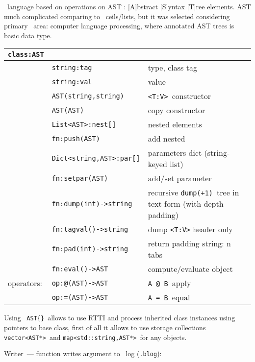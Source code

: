 \label{ast}\secdown

\bi\ language based on operations on AST :
[A]bstract [S]yntax [T]ree elements. AST much complicated comparing
to \lisp\ ceils/lists, but it was selected considering primary \bi\ area:
computer language processing, where annotated AST trees is basic data type.

\bigskip
\begin{tabular}{l l l}
\verb|class:AST| &&\\
\hline
& \verb|string:tag| & type, class tag \\
& \verb|string:val| & value \\
\hline
& \verb|AST(string,string)| & \verb|<T:V>|\ constructor \\
& \verb|AST(AST)| & copy constructor \\
\hline
& \verb|List<AST>:nest[]| & nested elements \\
& \verb|fn:push(AST)| & add nested \\
\hline
& \verb|Dict<string,AST>:par[]| & parameters dict (string-keyed list) \\
& \verb|fn:setpar(AST)| & add/set parameter \\
\hline
& \verb|fn:dump(int)->string| & recursive \verb|dump(+1)|\ tree in text
form (with depth padding) \\
& \verb|fn:tagval()->string| & dump \verb|<T:V>| header only \\
& \verb|fn:pad(int)->string| & return padding string: n tabs \\
\hline
& \verb|fn:eval()->AST| & compute/evaluate object \\
operators: & \verb|op:@(AST)->AST| & \verb|A @ B|\ apply \\
& \verb|op:=(AST)->AST| & \verb|A = B|\ equal \\
\end{tabular} 


Using \ \verb|AST{}|\ allows to use RTTI and process
inherited class instances using pointers to base class, first of all it allows
to use storage collections \verb|vector<AST*>|\ and
\verb|map<std::string,AST*>|\ for any objects.  


Writer\ --- function writes argument to \bi\ log (\verb|.blog|):



\secup
